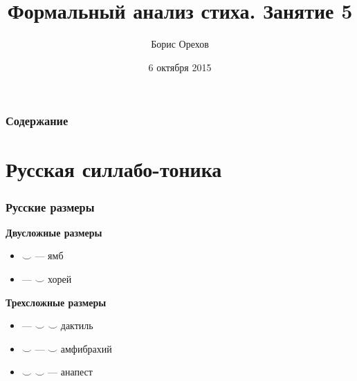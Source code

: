 \documentclass{beamer}
\title[Занятие 5]{Формальный анализ стиха. Занятие 5} %
\author{Борис Орехов} %
\institute[НИУ ВШЭ] %
{
НИУ Высшая школа экономики \\ %
\medskip
\textit{nevmenandr@gmail.com} %
}
\date{6 октября 2015} %
\begin{document}
\begin{frame}
\titlepage %
\end{frame}



\begin{frame}
\frametitle{Содержание}  %
\tableofcontents %
\end{frame}


\section{Русская силлабо-тоника}\label{sec:rusyl}

\begin{frame}
\frametitle{Русские размеры}
\begin{center}
\textbf{Двусложные размеры}
\end{center}

\begin{itemize}
\item  $\smile$ --- ямб
\item  --- $\smile$ хорей
\end{itemize}

\begin{center}
\textbf{Трехсложные размеры}
\end{center}

\begin{itemize}
\item  --- $\smile$ $\smile$ дактиль
\item  $\smile$ --- $\smile$ амфибрахий
\item  $\smile$ $\smile$ --- анапест
\end{itemize}

\end{frame}
\end{document}
